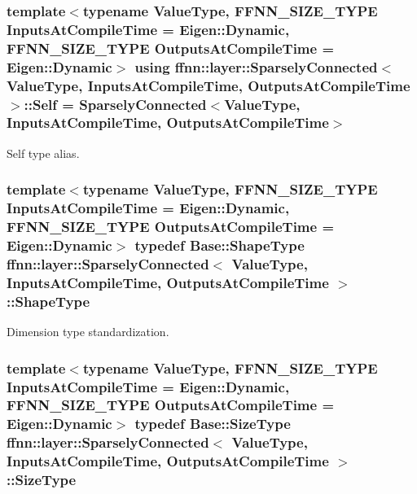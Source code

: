 \hypertarget{classffnn_1_1layer_1_1_sparsely_connected_ad27c96a5f26e2f44fb25bebd9a838666}{
\subsubsection[{Self}]{\setlength{\rightskip}{0pt plus 5cm}template$<$typename Value\-Type, F\-F\-N\-N\-\_\-\-S\-I\-Z\-E\-\_\-\-T\-Y\-P\-E Inputs\-At\-Compile\-Time = Eigen\-::\-Dynamic, F\-F\-N\-N\-\_\-\-S\-I\-Z\-E\-\_\-\-T\-Y\-P\-E Outputs\-At\-Compile\-Time = Eigen\-::\-Dynamic$>$ using {\bf ffnn\-::layer\-::\-Sparsely\-Connected}$<$ Value\-Type, Inputs\-At\-Compile\-Time, Outputs\-At\-Compile\-Time $>$\-::{\bf Self} =  {\bf Sparsely\-Connected}$<$Value\-Type, Inputs\-At\-Compile\-Time, Outputs\-At\-Compile\-Time$>$}}\label{classffnn_1_1layer_1_1_sparsely_connected_ad27c96a5f26e2f44fb25bebd9a838666}


Self type alias. 

\hypertarget{classffnn_1_1layer_1_1_sparsely_connected_aafb3514023fb9b1eaa11e4c4dbff4c99}{
\subsubsection[{Shape\-Type}]{\setlength{\rightskip}{0pt plus 5cm}template$<$typename Value\-Type, F\-F\-N\-N\-\_\-\-S\-I\-Z\-E\-\_\-\-T\-Y\-P\-E Inputs\-At\-Compile\-Time = Eigen\-::\-Dynamic, F\-F\-N\-N\-\_\-\-S\-I\-Z\-E\-\_\-\-T\-Y\-P\-E Outputs\-At\-Compile\-Time = Eigen\-::\-Dynamic$>$ typedef {\bf Base\-::\-Shape\-Type} {\bf ffnn\-::layer\-::\-Sparsely\-Connected}$<$ Value\-Type, Inputs\-At\-Compile\-Time, Outputs\-At\-Compile\-Time $>$\-::{\bf Shape\-Type}}}\label{classffnn_1_1layer_1_1_sparsely_connected_aafb3514023fb9b1eaa11e4c4dbff4c99}


Dimension type standardization. 

\hypertarget{classffnn_1_1layer_1_1_sparsely_connected_a86b75c2723c1f8b6771224257f5eb1c1}{
\subsubsection[{Size\-Type}]{\setlength{\rightskip}{0pt plus 5cm}template$<$typename Value\-Type, F\-F\-N\-N\-\_\-\-S\-I\-Z\-E\-\_\-\-T\-Y\-P\-E Inputs\-At\-Compile\-Time = Eigen\-::\-Dynamic, F\-F\-N\-N\-\_\-\-S\-I\-Z\-E\-\_\-\-T\-Y\-P\-E Outputs\-At\-Compile\-Time = Eigen\-::\-Dynamic$>$ typedef {\bf Base\-::\-Size\-Type} {\bf ffnn\-::layer\-::\-Sparsely\-Connected}$<$ Value\-Type, Inputs\-At\-Compile\-Time, Outputs\-At\-Compile\-Time $>$\-::{\bf Size\-Type}}}\label{classffnn_1_1layer_1_1_sparsely_connected_a86b75c2723c1f8b6771224257f5eb1c1}


